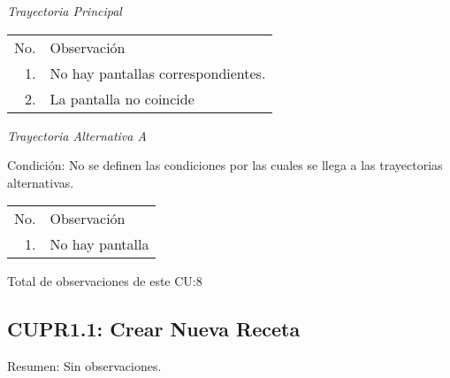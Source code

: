 \documentclass[10pt,spanish]{article}
\providecommand{\tabularnewline}{\\}
\begin{document}


\textit{\large Trayectoria Principal}{\large {} }{\large \par}
 
\begin{longtable}{rp{8cm}}
No.  & Observación\tabularnewline
1.  & No hay pantallas correspondientes.\tabularnewline
2.  & La pantalla no coincide\tabularnewline
\end{longtable}

\textit{Trayectoria Alternativa A}

Condición: No se definen las condiciones por las cuales se llega a las trayectorias alternativas.

\begin{longtable}{rp{8cm}}
No.  & Observación\tabularnewline
1. & No hay pantalla  \tabularnewline
\end{longtable}%
Total de observaciones de este CU:8

\newpage{}
\subsection{CUPR1.1: Crear Nueva Receta}

Resumen: Sin observaciones.

\end{document}
